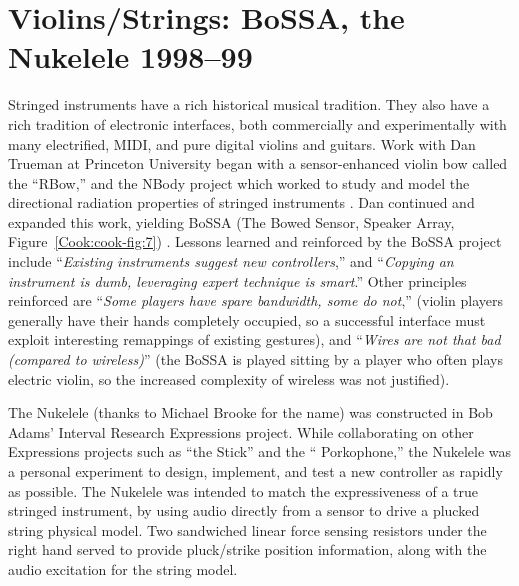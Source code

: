 \section{Violins/Strings:  BoSSA, the Nukelele    1998--99}

Stringed instruments have a rich historical musical tradition.  They also have a
rich tradition of electronic interfaces, both commercially and experimentally
with many electrified, MIDI, and pure digital violins and guitars.  Work with Dan
Trueman at Princeton University began with a sensor-enhanced violin bow called
the ``RBow,'' and the NBody project which worked to study and model the
directional radiation properties of stringed instruments \cite{Cook:1999}.  Dan continued and
expanded this work, yielding BoSSA (The Bowed Sensor, Speaker Array, Figure~\ref{Cook:cook-fig:7})
 \cite{Trueman:1999}.  Lessons learned and reinforced by the BoSSA project include
``\textit{Existing instruments suggest new controllers},'' and ``\textit{Copying
an instrument is dumb, leveraging expert technique is smart}.'' Other principles
reinforced are ``\textit{Some players have spare bandwidth, some do not},''
(violin players generally have their hands completely occupied, so a successful
interface must exploit interesting remappings of existing gestures),  and
``\textit{Wires are not that bad (compared to wireless)}'' (the BoSSA is played
sitting by a player who often plays electric violin, so the increased complexity
of wireless was not justified).

The Nukelele (thanks to Michael Brooke for the name) was constructed in Bob
Adams' Interval Research Expressions project.  While collaborating on other
Expressions projects such as ``the Stick'' and the `` Porkophone,'' the Nukelele
was a personal experiment to design, implement, and test a new controller as
rapidly as possible.  The Nukelele was intended to match the expressiveness of a
true stringed instrument, by using audio directly from a sensor to drive a
plucked string physical model.  Two sandwiched linear force sensing resistors
under the right hand served to provide pluck/strike position information, along
with the audio excitation for the string model.

